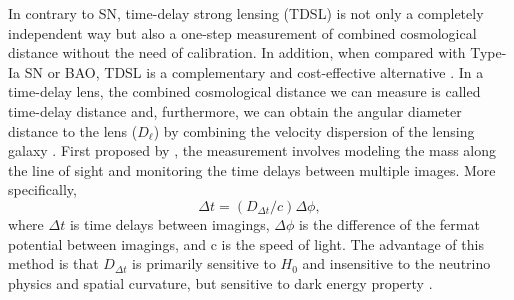\documentclass[useAMS,usenatbib]{mnras}
\def\dt{D_{\Delta t}}
\begin{document}

In contrary to SN, time-delay strong lensing (TDSL) is not only a completely independent way but also a one-step measurement of combined cosmological distance without the need of calibration. In addition, when compared with Type-Ia SN or BAO, TDSL is a complementary and cost-effective alternative \citep{SuyuEtal13,TewesEtal13a}.
In a time-delay lens, the combined cosmological distance we can measure is called time-delay distance \citep[$\dt$; see the review by][]{TreuMarshall16, SuyuEtal18} and, furthermore, we can obtain the angular diameter distance to the lens ($D_{\ell}$) by combining the velocity dispersion of the lensing galaxy \citep{JeeEtal15,JeeEtal16,BirrerEtal18}. 
First proposed by \citet{Refsdal64}, the measurement involves modeling the mass along the line of sight and monitoring the time delays between multiple images. 
More specifically, 
\begin{equation}
\Delta t=(\dt/c)\Delta\phi,
\end{equation}
where $\Delta t$ is time delays between imagings, $\Delta\phi$ is the difference of the fermat potential between imagings, and c is the speed of light. 
The advantage of this method is that $\dt$ is primarily sensitive to $H_{0}$ and insensitive to the neutrino physics and spatial curvature, but sensitive to dark energy property \citep{BonvinEtal17,BirrerEtal18}.

\end{document}
